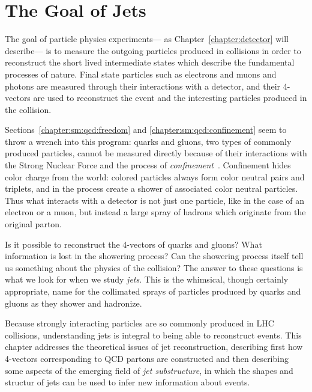 \label{chapter:jets-and-substructure}
\section{The Goal of Jets}

The goal of particle physics experiments--- as Chapter~\ref{chapter:detector} will describe--- is to measure the outgoing particles produced in collisions in order to reconstruct the short lived intermediate states which describe the fundamental processes of nature. Final state particles such as electrons and muons and photons are measured through their interactions with a detector, and their 4-vectors are used to reconstruct the event and the interesting particles produced in the collision. 

Sections~\ref{chapter:sm:qcd:freedom} and \ref{chapter:sm:qcd:confinement} seem to throw a wrench into this program: quarks and gluons, two types of commonly produced particles, cannot be measured directly because of their interactions with the Strong Nuclear Force and the process of \textit{confinement}~\cite{Wilson:1974sk}. Confinement hides color charge from the world: colored particles always form color neutral pairs and triplets, and in the process create a shower of associated color neutral particles. Thus what interacts with a detector is not just one particle, like in the case of an electron or a muon, but instead a large spray of hadrons which originate from the original parton.

Is it possible to reconstruct the 4-vectors of quarks and gluons? What information is lost in the showering process? Can the showering process itself tell us something about the physics of the collision? The answer to these questions is what we look for when we study \textit{jets}. This is the whimsical, though certainly appropriate, name for the collimated sprays of particles produced by quarks and gluons as they shower and hadronize. 

Because strongly interacting particles are so commonly produced in LHC collisions, understanding jets is integral to being able to reconstruct events. This chapter addresses the theoretical issues of jet reconstruction, describing first how 4-vectors corresponding to QCD partons are constructed and then describing some aspects of the emerging field of \textit{jet substructure}, in which the shapes and structur of jets can be used to infer new information about events.



